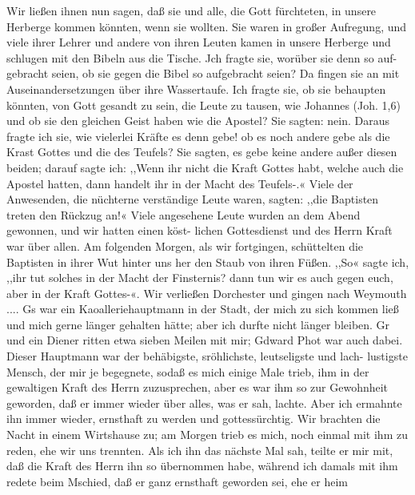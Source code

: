 Wir ließen ihnen nun sagen, daß sie und alle, die Gott fürchteten,
in unsere Herberge kommen könnten, wenn sie wollten. Sie
waren in großer Aufregung, und viele ihrer Lehrer und andere
von ihren Leuten kamen in unsere Herberge und schlugen mit den
Bibeln aus die Tische. Jch fragte sie, worüber sie denn so auf-
gebracht seien, ob sie gegen die Bibel so aufgebracht seien? Da
fingen sie an mit Auseinandersetzungen über ihre Wassertaufe.
Ich fragte sie, ob sie behaupten könnten, von Gott gesandt zu
sein, die Leute zu tausen, wie Johannes (Joh. 1,6) und ob sie
den gleichen Geist haben wie die Apostel? Sie sagten: nein.
Daraus fragte ich sie, wie vielerlei Kräfte es denn gebe! ob es
noch andere gebe als die Krast Gottes und die des Teufels?
Sie sagten, es gebe keine andere außer diesen beiden; darauf
sagte ich: ,,Wenn ihr nicht die Kraft Gottes habt, welche auch
die Apostel hatten, dann handelt ihr in der Macht des Teufels-.«
Viele der Anwesenden, die nüchterne verständige Leute waren,
sagten: ,,die Baptisten treten den Rückzug an!« Viele angesehene
Leute wurden an dem Abend gewonnen, und wir hatten einen köst-
lichen Gottesdienst und des Herrn Kraft war über allen. Am
folgenden Morgen, als wir fortgingen, schüttelten die Baptisten in
ihrer Wut hinter uns her den Staub von ihren Füßen. ,,So«
sagte ich, ,,ihr tut solches in der Macht der Finsternis? dann tun
wir es auch gegen euch, aber in der Kraft Gottes-«.
Wir verließen Dorchester und gingen nach Weymouth ....
Gs war ein Kaoalleriehauptmann in der Stadt, der mich zu sich
kommen ließ und mich gerne länger gehalten hätte; aber ich
durfte nicht länger bleiben. Gr und ein Diener ritten etwa
sieben Meilen mit mir; Gdward Phot war auch dabei. Dieser
Hauptmann war der behäbigste, sröhlichste, leutseligste und lach-
lustigste Mensch, der mir je begegnete, sodaß es mich einige Male
trieb, ihm in der gewaltigen Kraft des Herrn zuzusprechen, aber
es war ihm so zur Gewohnheit geworden, daß er immer wieder
über alles, was er sah, lachte. Aber ich ermahnte ihn immer
wieder, ernsthaft zu werden und gottessürchtig. Wir brachten die
Nacht in einem Wirtshause zu; am Morgen trieb es mich, noch
einmal mit ihm zu reden, ehe wir uns trennten. Als ich ihn
das nächste Mal sah, teilte er mir mit, daß die Kraft des Herrn
ihn so übernommen habe, während ich damals mit ihm redete
beim Mschied, daß er ganz ernsthaft geworden sei, ehe er heim


